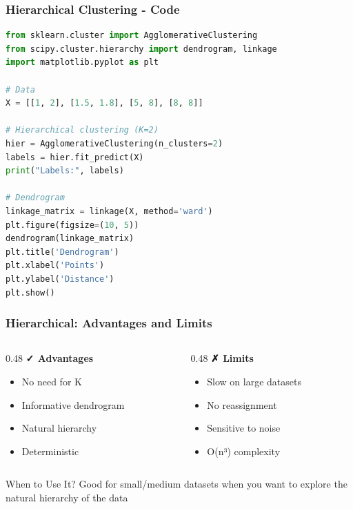 \documentclass{beamer}
\begin{document}
\begin{frame}[fragile]
\frametitle{Hierarchical Clustering - Code}
\begin{lstlisting}[language=Python]
from sklearn.cluster import AgglomerativeClustering
from scipy.cluster.hierarchy import dendrogram, linkage
import matplotlib.pyplot as plt

# Data
X = [[1, 2], [1.5, 1.8], [5, 8], [8, 8]]

# Hierarchical clustering (K=2)
hier = AgglomerativeClustering(n_clusters=2)
labels = hier.fit_predict(X)
print("Labels:", labels)

# Dendrogram
linkage_matrix = linkage(X, method='ward')
plt.figure(figsize=(10, 5))
dendrogram(linkage_matrix)
plt.title('Dendrogram')
plt.xlabel('Points')
plt.ylabel('Distance')
plt.show()
\end{lstlisting}
\end{frame}

\begin{frame}
\frametitle{Hierarchical: Advantages and Limits}
\begin{columns}
\begin{column}{0.48\textwidth}
\textbf{✓ Advantages}
\begin{itemize}
    \item No need for K
    \item Informative dendrogram
    \item Natural hierarchy
    \item Deterministic
\end{itemize}
\end{column}

\begin{column}{0.48\textwidth}
\textbf{✗ Limits}
\begin{itemize}
    \item Slow on large datasets
    \item No reassignment
    \item Sensitive to noise
    \item O(n³) complexity
\end{itemize}
\end{column}
\end{columns}

\vspace{1em}
\begin{block}{When to Use It?}
Good for small/medium datasets when you want to explore the natural hierarchy of the data
\end{block}
\end{frame}
\end{document}
